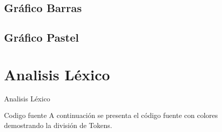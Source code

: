 \documentclass[10pt,xcolor={dvipsnames}]{beamer}
\begin{document}
    \subsection{Gráfico Barras}
        
    \subsection{Gráfico Pastel}
        

    \section{Analisis Léxico}
        \begin{frame}{Analisis Léxico}
        \begin{alertblock}{Codigo fuente}
            A continuación se presenta el código fuente con colores demostrando la división de Tokens.
            \end{alertblock}
        \end{frame}

        
\end{document}
